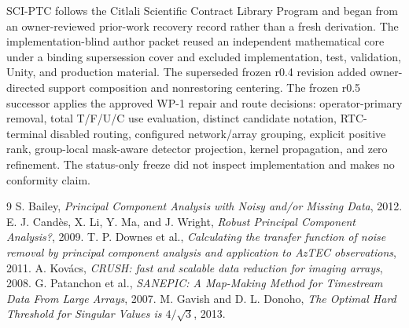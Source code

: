 \documentclass[11pt]{article}
\begin{document}
SCI-PTC follows the Citlali Scientific Contract Library Program and began from
an owner-reviewed prior-work recovery record rather than a fresh derivation.
The implementation-blind author packet reused an independent mathematical
core under a binding supersession cover and excluded implementation, test,
validation, Unity, and production material. The superseded frozen r0.4
revision added owner-directed support composition and nonrestoring centering.
The frozen r0.5 successor applies the approved WP-1 repair and route decisions:
operator-primary removal, total T/F/U/C use evaluation, distinct candidate
notation, RTC-terminal disabled routing, configured network/array grouping,
explicit positive rank, group-local mask-aware detector projection, kernel
propagation, and zero refinement. The status-only freeze did not inspect
implementation and makes no conformity claim.

\begingroup
\scriptsize
\begin{thebibliography}{9}
\setlength{\itemsep}{-1pt}
\setlength{\parskip}{0pt}
 S. Bailey, \textit{Principal Component Analysis with Noisy and/or Missing Data}, 2012.
 E. J. Cand\`es, X. Li, Y. Ma, and J. Wright, \textit{Robust Principal Component Analysis?}, 2009.
 T. P. Downes et al., \textit{Calculating the transfer function of noise removal by principal component analysis and application to AzTEC observations}, 2011.
 A. Kov\'acs, \textit{CRUSH: fast and scalable data reduction for imaging arrays}, 2008.
 G. Patanchon et al., \textit{SANEPIC: A Map-Making Method for Timestream Data From Large Arrays}, 2007.
 M. Gavish and D. L. Donoho, \textit{The Optimal Hard Threshold for Singular Values is $4/\sqrt{3}$}, 2013.
\end{thebibliography}
\endgroup
\end{document}
